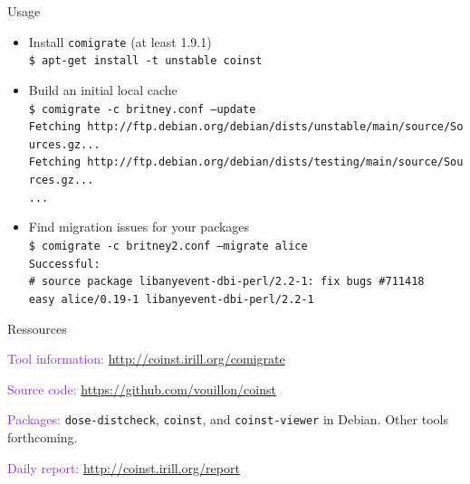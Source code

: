 \documentclass[xcolor={dvipsnames}]{beamer}
\newcommand{\EEE}[1]{\textcolor{BlueViolet}{#1}}
\begin{document}
\begin{frame}{Usage}

  \begin{itemize}
  \item Install \texttt{comigrate} (at least 1.9.1)\\
    \texttt{\$ apt-get install -t unstable coinst}

  \vfill

  \item Build an initial local cache\\
\texttt{\$ comigrate -c britney.conf --update}\\
{\scriptsize
\texttt{Fetching~http://ftp.debian.org/debian/dists/unstable/main/source/Sources.gz...}\\
\texttt{Fetching~http://ftp.debian.org/debian/dists/testing/main/source/Sources.gz...}\\
\texttt{...}
}

  \vfill

  \item Find migration issues for your packages\\
\texttt{\$ comigrate -c britney2.conf --migrate alice}\\
{\scriptsize
\texttt{Successful:}\\
\texttt{\# source package libanyevent-dbi-perl/2.2-1: fix bugs \#711418}\\
\texttt{easy alice/0.19-1 libanyevent-dbi-perl/2.2-1}
}

  \end{itemize}
\end{frame}

\begin{frame}{Ressources}

\EEE{Tool information:} \url{http://coinst.irill.org/comigrate}

\vspace{1em}

\EEE{Source code:} \url{https://github.com/vouillon/coinst}

\vspace{1em}

\EEE{Packages:} \texttt{dose-distcheck}, \texttt{coinst}, and
\texttt{coinst-viewer} in Debian. Other tools forthcoming.

\vspace{1em}

\EEE{Daily report:}
\url{http://coinst.irill.org/report}
\end{frame}
\end{document}
